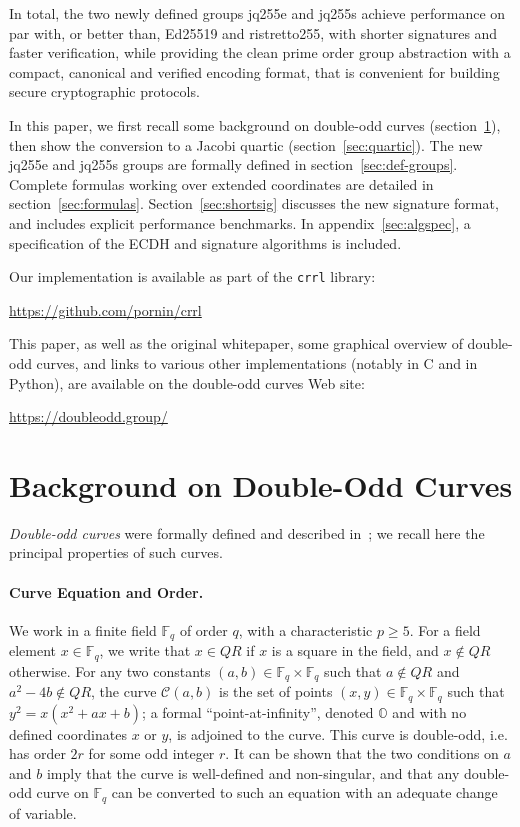 \documentclass{llncs}
\newcommand{\QR}{QR}
\newcommand{\bF}{\mathbb{F}}
\newcommand{\cC}{\mathcal{C}}
\newcommand{\neutral}{\mathbb{O}}
\begin{document}
In total, the two newly defined groups jq255e and jq255s achieve
performance on par with, or better than, Ed25519 and ristretto255, with
shorter signatures and faster verification, while providing the clean
prime order group abstraction with a compact, canonical and verified
encoding format, that is convenient for building secure cryptographic
protocols.

In this paper, we first recall some background on double-odd curves
(section~\ref{sec:background}), then show the conversion to a Jacobi
quartic (section~\ref{sec:quartic}). The new jq255e and jq255s groups
are formally defined in section~\ref{sec:def-groups}. Complete formulas
working over extended coordinates are detailed in
section~\ref{sec:formulas}. Section~\ref{sec:shortsig} discusses the new
signature format, and includes explicit performance benchmarks. In
appendix~\ref{sec:algspec}, a specification of the ECDH and signature
algorithms is included.

Our implementation is available as part of the \verb+crrl+ library:
\begin{center}
    \url{https://github.com/pornin/crrl}
\end{center}
This paper, as well as the original whitepaper\cite{Por2020-5}, some
graphical overview of double-odd curves, and links to various other
implementations (notably in C and in Python), are available on the
double-odd curves Web site:
\begin{center}
    \url{https://doubleodd.group/}
\end{center}


\section{Background on Double-Odd Curves}\label{sec:background}

\emph{Double-odd curves} were formally defined and described
in~\cite{Por2020-5}; we recall here the principal properties of
such curves.

\paragraph{Curve Equation and Order.}
We work in a finite field $\bF_q$ of order $q$, with a characteristic
$p \geq 5$. For a field element $x \in \bF_q$, we write that $x\in\QR$
if $x$ is a square in the field, and $x\notin\QR$ otherwise. For any two
constants $(a, b) \in \bF_q\times\bF_q$ such that $a\notin\QR$ and
$a^2-4b\notin\QR$, the curve $\cC(a,b)$ is the set of points
$(x,y)\in\bF_q\times\bF_q$ such that $y^2 = x(x^2 + ax + b)$; a formal
``point-at-infinity'', denoted $\neutral$ and with no defined
coordinates $x$ or $y$, is adjoined to the curve. This curve is
double-odd, i.e. has order $2r$ for some odd integer $r$. It can be
shown that the two conditions on $a$ and $b$ imply that the curve is
well-defined and non-singular, and that any double-odd curve on $\bF_q$
can be converted to such an equation with an adequate change of
variable.
\end{document}
